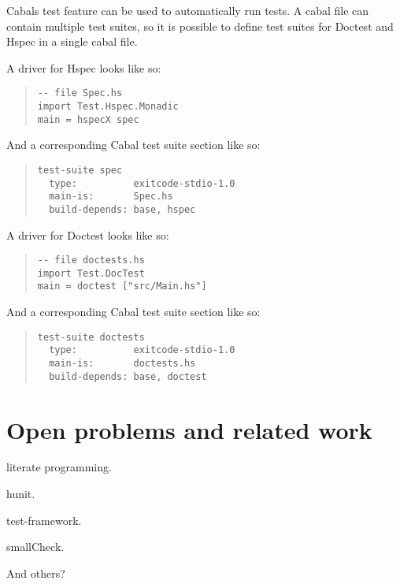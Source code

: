 \documentclass[preprint]{sigplanconf}
\newcommand{\hspec}{Hspec}
\begin{document}
\noindent Cabals test feature can be used to automatically run tests.  A cabal
file can contain multiple test suites, so it is possible to define test suites
for Doctest and \hspec{} in a single cabal file.

A driver for \hspec{} looks like so:

\begin{quote}
\small
\begin{verbatim}
-- file Spec.hs
import Test.Hspec.Monadic
main = hspecX spec
\end{verbatim}
\end{quote}

\noindent And a corresponding Cabal test suite section like so:

\begin{quote}
\small
\begin{verbatim}
test-suite spec
  type:          exitcode-stdio-1.0
  main-is:       Spec.hs
  build-depends: base, hspec
\end{verbatim}
\end{quote}

\noindent A driver for Doctest looks like so:

\begin{quote}
\small
\begin{verbatim}
-- file doctests.hs
import Test.DocTest
main = doctest ["src/Main.hs"]
\end{verbatim}
\end{quote}

\noindent And a corresponding Cabal test suite section like so:

\begin{quote}
\small
\begin{verbatim}
test-suite doctests
  type:          exitcode-stdio-1.0
  main-is:       doctests.hs
  build-depends: base, doctest
\end{verbatim}
\end{quote}

\section{Open problems and related work}

literate programming.

hunit.

test-framework.

smallCheck.

And others?
\end{document}
